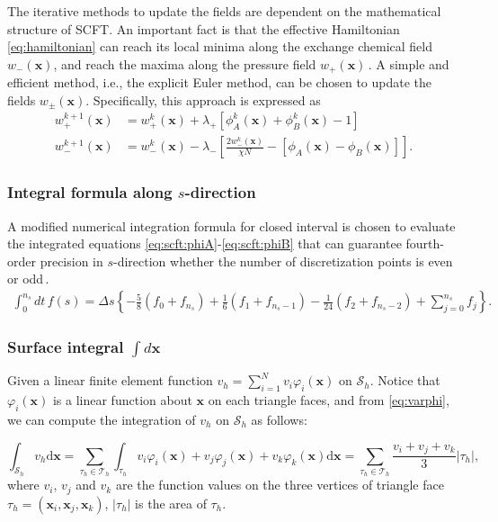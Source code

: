\documentclass[final,1p,times]{elsarticle}
\newcommand{\bx}{\mathbf{x}}
\newcommand{\calS}{\mathcal{S}}
\begin{document}
The iterative methods to update the fields 
are dependent on the mathematical structure of SCFT. 
An important fact is that the effective
Hamiltonian \eqref{eq:hamiltonian} can reach its local minima
along the exchange chemical field $w_-(\bx)$, and reach the maxima
along the pressure field
$w_+(\bx)$\,\cite{fredrickson2006equilibrium}. 
A simple and efficient method, i.e., the explicit Euler method, can be
chosen to update the fields $w_\pm(\bx)$. Specifically, this
approach is expressed as 
\begin{equation}
	\begin{aligned}
		w_+^{k+1}(\bx) &= w_+^k(\bx) + \lambda_+
		[\phi_A^k(\bx)+\phi_B^k(\bx)-1 ] 
		\\
		w_-^{k+1}(\bx) &= w_-^k(\bx) - \lambda_-
   \left[\frac{2 w_-^k(\bx)}{\chi N} - [\phi_A(\bx) - \phi_B(\bx)]
   \right].
	\end{aligned}
	\label{}
\end{equation}

\subsubsection{Integral formula along $s$-direction }
\label{subsubsec:sintegral}

A modified numerical integration formula for closed interval is
chosen to evaluate the integrated equations
\eqref{eq:scft:phiA}-\eqref{eq:scft:phiB} that can guarantee
fourth-order precision in $s$-direction whether the number of
discretization points is even or odd\,\cite{press1992numerical}.
\begin{align}
	\int_{0}^{n_s} dt\,f(s) = \Delta s \left\{
	-\frac{5}{8}(f_0+f_{n_s}) 
	+\frac{1}{6}(f_1+f_{n_s -1}) 
	-\frac{1}{24}(f_2+f_{n_s-2}) 
	+\sum_{j=0}^{n_s} f_{j} 
	\right\}.
\end{align}

\subsubsection{Surface integral $\int d\bx$ }

Given a linear finite element function $v_h = \sum_{i=1}^N v_i\varphi_i(\bx)$ on
$\calS_h$. Notice that $\varphi_i(\bx)$ is a linear function about $\bx$ on each
triangle faces, and from \eqref{eq:varphi}, we can compute the integration of $v_h$ on
$\calS_h$ as follows: 

\begin{equation*}
    \int_{\calS_h} v_h \mathrm d \bx = \sum_{\tau_h\in\mathcal T_h} \int_{\tau_h}
    v_i\varphi_i(\bx) + v_j\varphi_j(\bx) + v_k\varphi_k(\bx) \mathrm d \bx = \sum_{\tau_h\in\mathcal T_h} \frac{v_i + v_j +
    v_k}{3}|\tau_h|, 
\end{equation*}
where $v_i$, $v_j$ and $v_k$ are the function values on the three vertices
of triangle face $\tau_h = (\bx_i, \bx_j, \bx_k)$, $|\tau_h|$ is the area of
$\tau_h$.
\end{document}
